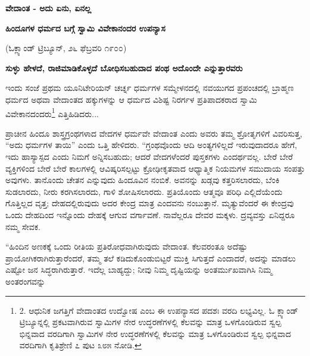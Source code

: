 \begin{center}
\textbf{ವೇದಾಂತ - ಅದು ಏನು, ಏನಲ್ಲ}
\end{center}

\begin{center}
\textbf{ಹಿಂದೂಗಳ ಧರ್ಮದ ಬಗ್ಗೆ ಸ್ವಾಮಿ ವಿವೇಕಾನಂದರ ಉಪನ್ಯಾಸ}
\end{center}

\begin{center}
(ಓಕ್ಲ್ಯಾಂಡ್ ಟ್ರಿಬ್ಯೂನ್, ೨೬ ಫೆಬ್ರವರಿ ೧೯೦೦)
\end{center}

\begin{center}
\textbf{ಸುಳ್ಳು ಹೇಳದೆ, ರಾಜಿಮಾಡಿಕೊಳ್ಳದೆ ಬೋಧಿಸಬಹುದಾದ ಪಂಥ ಅದೊಂದೇ ಎನ್ನುತ್ತಾರವರು}
\end{center}

ಇಂದು ಸಂಜೆ ಪ್ರಥಮ ಯೂನಿಟೇರಿಯನ್ ಚರ್ಚ್ನ ಧರ್ಮಗಳ ಸಮ್ಮೇಳನದಲ್ಲಿ ನವಯುಗದ ಪ್ರಪಂಚದಲ್ಲಿ ಬ್ರಾಹ್ಮಣ ಧರ್ಮದ ಅಥವಾ ವೇದಾಂತದ ಹಕ್ಕುಗಳನ್ನು ಆ ಧರ್ಮದ ವಿಶಿಷ್ಟ ನಿರರ್ಗಳ ಪ್ರತಿಪಾದಕರಾದ ಸ್ವಾಮಿ ವಿವೇಕಾನದಂದರು\footnote{2. ಆಧುನಿಕ ಜಗತ್ತಿಗೆ ವೇದಾಂತದ ಉದ್ವೋಷ ಎಂಬ ಈ ಉಪನ್ಯಾಸದ ಪದಶಃ ವರದಿ ಲಭ್ಯವಿಲ್ಲ. ಓ ಕ್ಲ್ಯಾಂಡ್ ಟ್ರಿಬ್ಯೂನ್ನಲ್ಲಿ ಪ್ರಕಟವಾಗಿರುವ ಸ್ವಾಮಿಗಳ ನೇರ ಉದ್ಧರಣೆಗಳಲ್ಲಿ ಕೆಲವನ್ನು ಮಾತ್ರ ಒಳಗೊಂಡಿರುವ ಸ್ವಲ್ಪ ಭಿನ್ನವಾದ ವರದಿಗಾಗಿ ಸ್ವಾಮಿಗಳ ನೇರ ಉದ್ಧರಣೆಗಳಲ್ಲಿ ಕೆಲವನ್ನು ಮಾತ್ರ ಒಳಗೊಂಡಿರುವ ಸ್ವಲ್ಪ ಭಿನ್ನವಾದ ವರದಿಗಾಗಿ ಕೃತಿಶ್ರೇಣಿ ೭ ಪುಟ ೩೮೫ ನೋಡಿ.} ಎತ್ತಿಹಿಡಿದರು...

ಪ್ರಾಚೀನ ಹಿಂದೂ ಶಾಸ್ತ್ರಗ್ರಂಥಗಳಾದ ವೇದಗಳ ಧರ್ಮವೇ ವೇದಾಂತ ಎಂದು ಅವರು ತಮ್ಮ ಶ್ರೋತೃಗಳಿಗೆ ವಿವರಿಸುತ್ತ, “ಅದು ಧರ್ಮಗಳ ತಾಯಿ” ಎಂದು ಒತ್ತಿ ಹೇಳಿದರು. “ಗ್ರಂಥವೊಂದು ಆದಿ ಅಂತ್ಯಗಳಿಲ್ಲದೆ ಇರುವುದಾದರೂ ಹೇಗೆ, ಇದು ಹಾಸ್ಯಾಸ್ಪದ ಎಂದು ನಿಮಗೆ ಅನ್ನಿಸಬಹುದು; ಆದರೆ ವೇದಗಳೆಂದರೆ ಪುಸ್ತಕಗಳು ಎಂದರ್ಥವಲ್ಲ. ಬೇರೆ ಬೇರೆ ವ್ಯಕ್ತಿಗಳಿಂದ ಬೇರೆ ಬೇರೆ ಕಾಲಗಳಲ್ಲಿ ಆವಿಷ್ಕರಿಸಲ್ಪಟ್ಟು ಕ್ರೋಢೀಕೃತವಾದ ಆಧ್ಯಾತ್ಮಿಕ ನಿಯಮಗಳ ಸಮುದಾಯ ಸಂಪತ್ತು ಅವುಗಳು. ತಾನೊಂದು ಚೇತನ ಎನ್ನುವುದು ಹಿಂದೂವಿನ ನಂಬಿಕೆ. ಅವನನ್ನು ಖಡ್ಗವು ಕತ್ತರಿಸಲಾರದು, ಬೆಂಕಿ ಸುಡಲಾರದು, ನೀರು ಕರಗಿಸಲಾರದು, ಗಾಳಿ ಶೋಷಿಸಲಾರದು. ಪ್ರತಿಯೊಂದು ಆತ್ಮವೂ ಪರಿಧಿ ಎಲ್ಲಿದೆಯೆಂದು ಗೊತ್ತಿಲ್ಲದ ವೃತ್ತ; ದೇಹದಲ್ಲಿರುವುದು ಅದರ ಕೇಂದ್ರ ಮಾತ್ರ ಎಂದವನು ನಂಬುತ್ತಾನೆ. ಮೃತ್ಯುವೆಂದರೆ ಈ ಕೇಂದ್ರವು ಒಂದು ದೇಹದಿಂದ ಇನ್ನೊಂದು ದೇಹಕ್ಕೆ ಆಗುವ ವರ್ಗಾವಣೆ. ನಾವೆಲ್ಲರೂ ದೇವರ ಮಕ್ಕಳು. ದ್ರವ್ಯವಸ್ತು ಏನಿದ್ದರೂ ನಮ್ಮ ಸೇವಕ.

“ಹಿಂದಿನ ಅಣಕಕ್ಕೆ ಒಂದು ರೀತಿಯ ಪ್ರತಿರೋಧವಾಗಿರುವುದು ವೇದಾಂತ. ಕೆಲವರಂತೂ ಅದೆಷ್ಟು ಪ್ರಾಯೋಗಿಕರಾಗಿರುತ್ತಾರೆಂದರೆ, ತಮ್ಮ ತಲೆ ಕಡಿದುಕೊಂಡುಬಿಟ್ಟರೆ ಮುಕ್ತಿ ಸಿಗುತ್ತದೆ ಎಂದಾದರೆ, ಅದನ್ನು ಮಾಡಲು ಎಷ್ಟೋ ಜನ ಸಿದ್ಧರಾಗಿರುತ್ತಾರೆ. ಇದೆಲ್ಲ ಬಾಹ್ಯದ್ದು; ನೀವು ನಿಮ್ಮ ದೃಷ್ಟಿಯನ್ನು ಅಂತರ್ಮುಖವಾಗಿಸಿ ನಿಮ್ಮ ಅಂತರಂಗವನ್ನು

